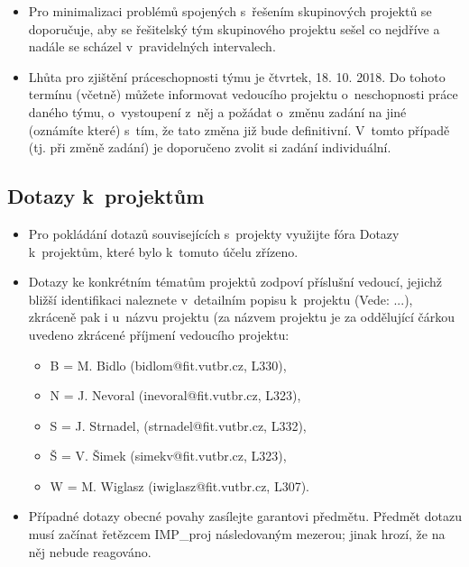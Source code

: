 \documentclass[11pt, a4paper, titlepage]{article}
\begin{document}
\begin{itemize}
    \item Pro minimalizaci problémů spojených s~řešením skupinových projektů se doporučuje, aby se řešitelský tým skupinového projektu sešel co nejdříve a nadále se scházel v~pravidelných intervalech.
    \item Lhůta pro zjištění práceschopnosti týmu je čtvrtek, 18. 10. 2018. Do tohoto termínu (včetně) můžete informovat vedoucího projektu o~neschopnosti práce daného týmu, o~vystoupení z~něj a požádat o~změnu zadání na jiné (oznámíte které) s~tím, že tato změna již bude definitivní. V~tomto případě (tj. při změně zadání) je doporučeno zvolit si zadání individuální.
\end{itemize}


\subsection*{Dotazy k~projektům}

\begin{itemize}
    \item Pro pokládání dotazů souvisejících s~projekty využijte fóra Dotazy k~projektům, které bylo k~tomuto účelu zřízeno.
    \item Dotazy ke konkrétním tématům projektů zodpoví příslušní vedoucí, jejichž bližší identifikaci naleznete v~detailním popisu k~projektu (Vede: ...), zkráceně pak i u~názvu projektu (za názvem projektu je za oddělující čárkou uvedeno zkrácené příjmení vedoucího projektu:
    \begin{itemize}
        \item B = M. Bidlo (bidlom@fit.vutbr.cz, L330),
        \item N = J. Nevoral (inevoral@fit.vutbr.cz, L323),
        \item S = J. Strnadel, (strnadel@fit.vutbr.cz, L332),
        \item Š = V. Šimek (simekv@fit.vutbr.cz, L323),
        \item W = M. Wiglasz (iwiglasz@fit.vutbr.cz, L307).
    \end{itemize}
    \item Případné dotazy obecné povahy zasílejte garantovi předmětu. Předmět dotazu musí začínat řetězcem IMP\_proj následovaným mezerou; jinak hrozí, že na něj nebude reagováno.
\end{itemize}
\end{document}
